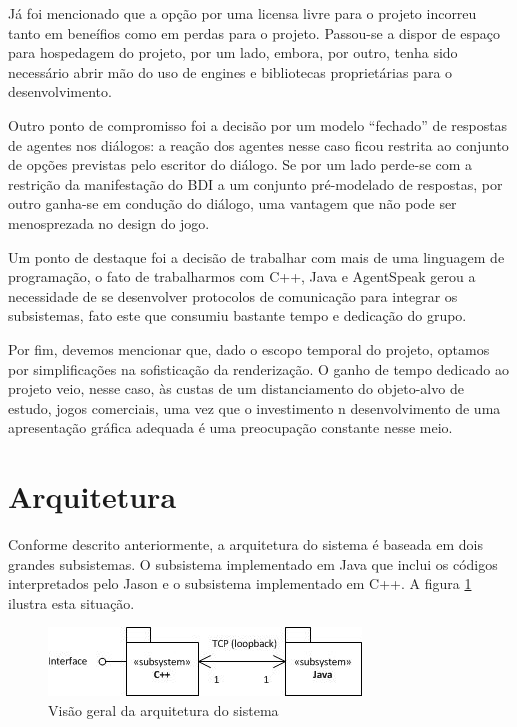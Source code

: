 Já foi mencionado que a opção por uma licensa livre para o projeto incorreu tanto em beneífios como em perdas para o projeto. Passou-se a dispor de espaço para hospedagem do projeto, por um lado, embora, por outro, tenha sido necessário abrir mão do uso de engines e bibliotecas proprietárias para o desenvolvimento.

Outro ponto de compromisso foi a decisão por um modelo ``fechado'' de respostas de agentes nos diálogos: a reação dos agentes nesse caso ficou restrita ao conjunto de opções previstas pelo escritor do diálogo. Se por um lado perde-se com a restrição da manifestação do BDI a um conjunto pré-modelado de respostas, por outro ganha-se em condução do diálogo, uma vantagem que não pode ser menosprezada no design do jogo.

Um ponto de destaque foi a decisão de trabalhar com mais de uma linguagem de programação, o fato de trabalharmos com C++, Java e AgentSpeak gerou a necessidade de se desenvolver protocolos de comunicação para integrar os subsistemas, fato este que consumiu bastante tempo e dedicação do grupo.

Por fim, devemos mencionar que, dado o escopo temporal do projeto, optamos por simplificações na sofisticação da renderização. O ganho de tempo dedicado ao projeto veio, nesse caso, às custas de um distanciamento do objeto-alvo de estudo, jogos comerciais, uma vez que o investimento n desenvolvimento de uma apresentação gráfica adequada é uma preocupação constante nesse meio.

\section{Arquitetura}

Conforme descrito anteriormente, a arquitetura do sistema é baseada em dois grandes subsistemas. O subsistema implementado em Java que inclui os códigos interpretados pelo Jason e o subsistema implementado em C++. A figura \ref{arquiteturaGeral} ilustra esta situação.

\begin{figure}
\centering
\includegraphics{figuras/arquitetura.jpg}
\caption{Visão geral da arquitetura do sistema}
\label{arquiteturaGeral}
\end{figure}


